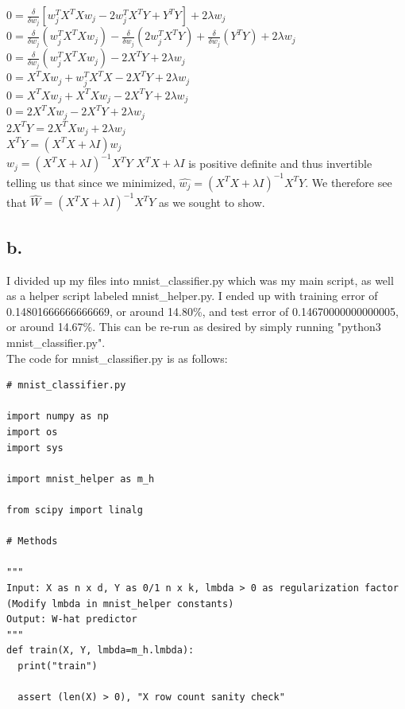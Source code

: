 \documentclass{article}
\newcommand{\1}{\mathbf{1}}
\begin{document}
{$0 = \frac{\delta }{\delta w_j}[w_j^TX^TXw_j - 2w_j^TX^TY + Y^TY] +  2\lambda w_j$ \\
$0 = \frac{\delta }{\delta w_j}(w_j^TX^TXw_j) - \frac{\delta }{\delta w_j}(2w_j^TX^TY) + \frac{\delta }{\delta w_j}(Y^TY) +  2\lambda w_j$ \\
$0 = \frac{\delta }{\delta w_j}(w_j^TX^TXw_j) - 2X^TY +  2\lambda w_j$ \\
$0 = X^TXw_j + w_j^TX^TX - 2X^TY +  2\lambda w_j$ \\
$0 = X^TXw_j + X^TXw_j - 2X^TY +  2\lambda w_j$ \\
$0 = 2X^TXw_j - 2X^TY +  2\lambda w_j$ \\
$2X^TY = 2X^TXw_j +  2\lambda w_j$ \\
$X^TY = (X^TX + \lambda I)w_j$ \\ 
$w_j = (X^TX + \lambda I)^{-1}X^TY$ \hfill $X^TX + \lambda I$ is positive definite and thus invertible \\
telling us that since we minimized, $\widehat{w_j} = (X^TX + \lambda I)^{-1}X^TY$. We therefore see that $\widehat{W} = (X^TX + \lambda I)^{-1}X^TY$ as we sought to show.

\subsection*{b.}

I divided up my files into mnist\_classifier.py which was my main script, as well as a helper script labeled mnist\_helper.py. I ended up with training error of 0.14801666666666669, or around 14.80\%, and test error of 0.14670000000000005, or around 14.67\%. This can be re-run as desired by simply running "python3 mnist\_classifier.py". \\
The code for mnist\_classifier.py is as follows: \\

\begin{verbatim}
# mnist_classifier.py

import numpy as np
import os
import sys

import mnist_helper as m_h

from scipy import linalg

# Methods

"""
Input: X as n x d, Y as 0/1 n x k, lmbda > 0 as regularization factor
(Modify lmbda in mnist_helper constants)
Output: W-hat predictor
"""
def train(X, Y, lmbda=m_h.lmbda):
  print("train")

  assert (len(X) > 0), "X row count sanity check"


\end{verbatim}}
\end{document}

